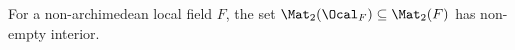 For a non-archimedean local field $F$, the set $\Mat_2(\Ocal_F)\subseteq\Mat_2(F)$ has non-empty interior.
